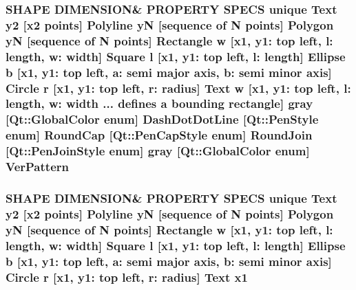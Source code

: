 \subsubsection[{\texorpdfstring{Ver\+Pattern}{VerPattern}}]{\setlength{\rightskip}{0pt plus 5cm}S\+H\+A\+PE D\+I\+M\+E\+N\+S\+I\+ON\& P\+R\+O\+P\+E\+R\+TY S\+P\+E\+CS unique {\bf Text} {\bf y2} \mbox{[}{\bf x2} points\mbox{]} {\bf Polyline} yN \mbox{[}sequence of N points\mbox{]} {\bf Polygon} yN \mbox{[}sequence of N points\mbox{]} {\bf Rectangle} w \mbox{[}{\bf x1}, y1\+: top left, l\+: length, w\+: width\mbox{]} {\bf Square} {\bf l} \mbox{[}{\bf x1}, y1\+: top left, l\+: length\mbox{]} {\bf Ellipse} b \mbox{[}{\bf x1}, y1\+: top left, a\+: semi major axis, b\+: semi minor axis\mbox{]} {\bf Circle} r \mbox{[}{\bf x1}, y1\+: top left, r\+: radius\mbox{]} {\bf Text} w \mbox{[}{\bf x1}, y1\+: top left, l\+: length, w\+: width ... defines {\bf a} bounding rectangle\mbox{]} gray \mbox{[}Qt\+::\+Global\+Color enum\mbox{]} Dash\+Dot\+Dot\+Line \mbox{[}Qt\+::\+Pen\+Style enum\mbox{]} Round\+Cap \mbox{[}{\bf Qt\+::\+Pen\+Cap\+Style} enum\mbox{]} Round\+Join \mbox{[}{\bf Qt\+::\+Pen\+Join\+Style} enum\mbox{]} gray \mbox{[}Qt\+::\+Global\+Color enum\mbox{]} Ver\+Pattern}\hypertarget{shape__input__file__specs_8txt_abe8b0fed5e2471bcf0087a518498641a}{}\label{shape__input__file__specs_8txt_abe8b0fed5e2471bcf0087a518498641a}
\subsubsection[{\texorpdfstring{x1}{x1}}]{\setlength{\rightskip}{0pt plus 5cm}S\+H\+A\+PE D\+I\+M\+E\+N\+S\+I\+ON\& P\+R\+O\+P\+E\+R\+TY S\+P\+E\+CS unique {\bf Text} {\bf y2} \mbox{[}{\bf x2} points\mbox{]} {\bf Polyline} yN \mbox{[}sequence of N points\mbox{]} {\bf Polygon} yN \mbox{[}sequence of N points\mbox{]} {\bf Rectangle} w \mbox{[}x1, y1\+: top left, l\+: length, w\+: width\mbox{]} {\bf Square} {\bf l} \mbox{[}x1, y1\+: top left, l\+: length\mbox{]} {\bf Ellipse} b \mbox{[}x1, y1\+: top left, a\+: semi major axis, b\+: semi minor axis\mbox{]} {\bf Circle} r \mbox{[}x1, y1\+: top left, r\+: radius\mbox{]} {\bf Text} x1}\hypertarget{shape__input__file__specs_8txt_a2c75107475dd4c72dd2083af2e04d090}{}\label{shape__input__file__specs_8txt_a2c75107475dd4c72dd2083af2e04d090}
